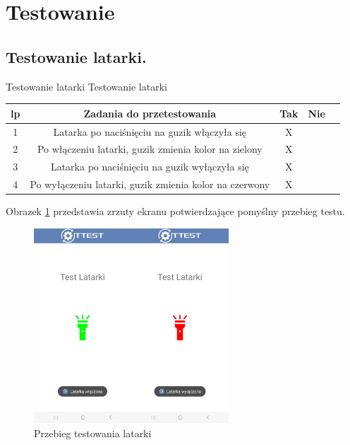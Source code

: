 	\newpage
\section{Testowanie}	%

\subsection{Testowanie latarki.}

\begin{tabela}
	{Testowanie latarki}	%
	{Testowanie latarki}	%
	{
		\begin{tabular}{|c|c|c|c|c|} \hline
			lp & Zadania do przetestowania & Tak & Nie \\ \hline
			1 & Latarka po naciśnięciu na guzik włączyła się & X & ~ \\ \hline
			2 & Po włączeniu latarki, guzik zmienia kolor na zielony & X & ~ \\ \hline
			3 & Latarka po naciśnięciu na guzik wyłączyła się & X & ~ \\ \hline
			4 & Po wyłączeniu latarki, guzik zmienia kolor na czerwony & X & ~ \\ \hline
		\end{tabular}	}
	\label{tab:tablica001}
\end{tabela}

Obrazek \ref{rys:latarka} przedstawia zrzuty ekranu potwierdzające pomyślny przebieg testu.

\begin{figure}[!hbt]
	\begin{center}
		\includegraphics[angle=360, width=0.65\textwidth]{rys/punkt5/latarka.jpg}
		\caption{Przebieg testowania latarki}
		\label{rys:latarka}
	\end{center}
\end{figure}   


